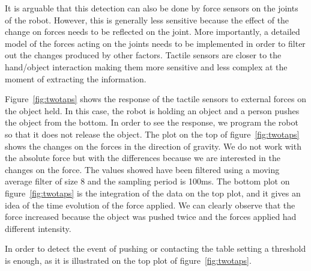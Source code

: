 It is arguable that this detection can also be done by force
sensors on the joints of the robot. However, this is generally
less sensitive because the effect of the change on forces needs to
be reflected on the joint. More importantly, a detailed model of
the forces acting on the joints needs to be implemented in order
to filter out the changes produced by other factors. Tactile
sensors are closer to the hand/object interaction making them more
sensitive and less complex at the moment of extracting the
information.

Figure~\ref{fig:twotaps} shows the response of the tactile sensors
to external forces on the object held. In this case, the robot is
holding an object and a person pushes the object from the bottom.
In order to see the response, we program the robot so that it does
not release the object. The plot on the top of
figure~\ref{fig:twotaps} shows the changes on the forces in the
direction of gravity.  We do not work with the absolute force but
with the differences because we are interested in the changes on
the force. The values showed have been filtered using a moving
average filter of size 8 and the sampling period is 100ms. The
bottom plot on figure~\ref{fig:twotaps} is the integration of the
data on the top plot, and it gives an idea of the time evolution
of the force applied. We can clearly observe that the force
increased because the object was pushed twice and the forces
applied had different intensity.

In order to detect the event of pushing or contacting the table
setting a threshold is enough, as it is illustrated on the top
plot of figure~\ref{fig:twotaps}.


